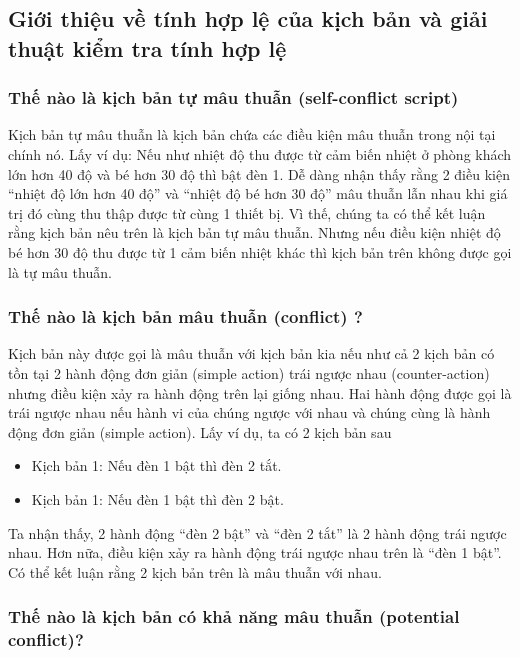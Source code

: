 \documentclass[12pt,a4paper,oneside]{extbook}
\begin{document}
\subsection{Giới thiệu về tính hợp lệ của kịch bản và giải thuật kiểm tra tính hợp lệ}\label{script-validation}

\subsubsection{Thế nào là kịch bản tự mâu thuẫn (self-conflict script)}

Kịch bản tự mâu thuẫn là kịch bản chứa các điều kiện mâu thuẫn trong nội tại chính nó. Lấy ví dụ: Nếu như nhiệt độ thu được từ cảm biến nhiệt ở phòng khách lớn hơn 40 độ và bé hơn 30 độ thì bật đèn 1. Dễ dàng nhận thấy rằng 2 điều kiện “nhiệt độ lớn hơn 40 độ” và “nhiệt độ bé hơn 30 độ” mâu thuẫn lẫn nhau khi giá trị đó cùng thu thập được từ cùng 1 thiết bị. Vì thế, chúng ta có thể kết luận rằng kịch bản nêu trên là kịch bản tự mâu thuẫn. Nhưng nếu điều kiện nhiệt độ bé hơn 30 độ thu được từ 1 cảm biến nhiệt khác thì kịch bản trên không được gọi là tự mâu thuẫn.

\subsubsection{Thế nào là kịch bản mâu thuẫn (conflict) ?}\label{scenario-conflict}

Kịch bản này được gọi là mâu thuẫn với kịch bản kia nếu như cả 2 kịch bản có tồn tại 2 hành động đơn giản (simple action) trái ngược nhau (counter-action) nhưng điều kiện xảy ra hành động trên lại giống nhau. Hai hành động được gọi là trái ngược nhau nếu hành vi của chúng ngược với nhau và chúng cùng là hành động đơn giản (simple action). Lấy ví dụ, ta có 2 kịch bản sau

	\begin{itemize}[topsep=1mm,itemsep=-0.5mm]
	\item Kịch bản 1: Nếu đèn 1 bật thì đèn 2 tắt.
	\item Kịch bản 1: Nếu đèn 1 bật thì đèn 2 bật.
	\vspace{1mm}
	\end{itemize}

\noindent
Ta nhận thấy, 2 hành động “đèn 2 bật” và “đèn 2 tắt” là 2 hành động trái ngược nhau. Hơn nữa, điều kiện xảy ra hành động trái ngược nhau trên là “đèn 1 bật”. Có thể kết luận rằng 2 kịch bản trên là mâu thuẫn với nhau.

\subsubsection{Thế nào là kịch bản có khả năng mâu thuẫn (potential conflict)?}
\end{document}
